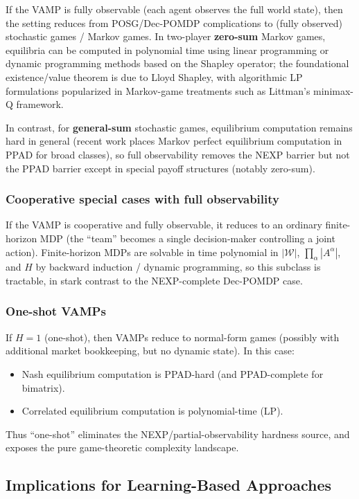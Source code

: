 If the VAMP is fully observable (each agent observes the full world state), then the setting reduces from POSG/Dec-POMDP complications to (fully observed) stochastic games / Markov games. In two-player \textbf{zero-sum} Markov games, equilibria can be computed in polynomial time using linear programming or dynamic programming methods based on the Shapley operator; the foundational existence/value theorem is due to Lloyd Shapley, with algorithmic LP formulations popularized in Markov-game treatments such as Littman's minimax-Q framework.

In contrast, for \textbf{general-sum} stochastic games, equilibrium computation remains hard in general (recent work places Markov perfect equilibrium computation in PPAD for broad classes), so full observability removes the NEXP barrier but not the PPAD barrier except in special payoff structures (notably zero-sum).

\subsubsection{Cooperative special cases with full observability}

If the VAMP is cooperative and fully observable, it reduces to an ordinary finite-horizon MDP (the ``team'' becomes a single decision-maker controlling a joint action). Finite-horizon MDPs are solvable in time polynomial in \(|\mathcal W|\), \(\prod_\alpha |A^\alpha|\), and \(H\) by backward induction / dynamic programming, so this subclass is tractable, in stark contrast to the NEXP-complete Dec-POMDP case.

\subsubsection{One-shot VAMPs}

If \(H=1\) (one-shot), then VAMPs reduce to normal-form games (possibly with additional market bookkeeping, but no dynamic state). In this case:
\begin{itemize}
\item Nash equilibrium computation is PPAD-hard (and PPAD-complete for bimatrix).
\item Correlated equilibrium computation is polynomial-time (LP).
\end{itemize}

Thus ``one-shot'' eliminates the NEXP/partial-observability hardness source, and exposes the pure game-theoretic complexity landscape.

\subsection{Implications for Learning-Based Approaches}

